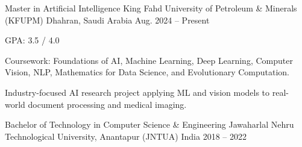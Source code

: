

\begin{cventries}

  \cventry
    {Master in Artificial Intelligence} %
    {King Fahd University of Petroleum \& Minerals (KFUPM)} %
    {Dhahran, Saudi Arabia} %
    {Aug. 2024 – Present} %
    {
      \begin{cvitems}
        \item {GPA: 3.5 / 4.0}
        \item {Coursework: Foundations of AI, Machine Learning, Deep Learning, Computer Vision, NLP, Mathematics for Data Science, and Evolutionary Computation.}
        \item {Industry-focused AI research project applying ML and vision models to real-world document processing and medical imaging.}
      \end{cvitems}
    }

  \cventry
    {Bachelor of Technology in Computer Science \& Engineering} %
    {Jawaharlal Nehru Technological University, Anantapur (JNTUA)} %
    {India} %
    {2018 – 2022} %
    {
      \begin{cvitems}
      \end{cvitems}
    }

\end{cventries}
